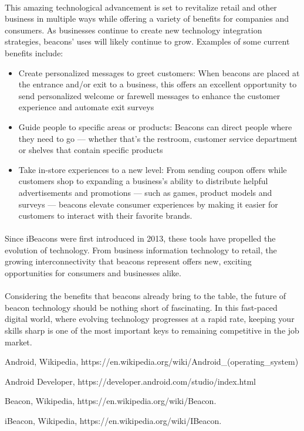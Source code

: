 \documentclass[a4paper,12pt]{report}
\begin{document}
\paragraph{}This amazing technological advancement is set to revitalize retail and other business in multiple ways while offering a variety of benefits for companies and consumers. As businesses continue to create new technology integration strategies, beacons' uses will likely continue to grow. Examples of some current benefits include:
\begin{itemize}
	\item Create personalized messages to greet customers: When beacons are placed at the entrance and/or exit to a business, this offers an excellent opportunity to send personalized welcome or farewell messages to enhance the customer experience and automate exit surveys
	\item Guide people to specific areas or products: Beacons can direct people where they need to go — whether that's the restroom, customer service department or shelves that contain specific products
	\item Take in-store experiences to a new level: From sending coupon offers while customers shop to expanding a business's ability to distribute helpful advertisements and promotions — such as games, product models and surveys — beacons elevate consumer experiences by making it easier for customers to interact with their favorite brands.
\end{itemize}
\paragraph{}Since iBeacons were first introduced in 2013, these tools have propelled the evolution of technology. From business information technology to retail, the growing interconnectivity that beacons represent offers new, exciting opportunities for consumers and businesses alike.
\paragraph{}Considering the benefits that beacons already bring to the table, the future of beacon technology should be nothing short of fascinating. In this fast-paced digital world, where evolving technology progresses at a rapid rate, keeping your skills sharp is one of the most important keys to remaining competitive in the job market.

\newpage
{}
\renewcommand\bibname{\textbf{REFERENCES}}


\begin{thebibliography}{1}
	
	Android, Wikipedia, https://en.wikipedia.org/wiki/Android\_(operating\_system)
	
	Android Developer, https://developer.android.com/studio/index.html
	
	Beacon, Wikipedia, https://en.wikipedia.org/wiki/Beacon.
	
	iBeacon, Wikipedia, https://en.wikipedia.org/wiki/IBeacon.
	
\end{thebibliography}
\end{document}
